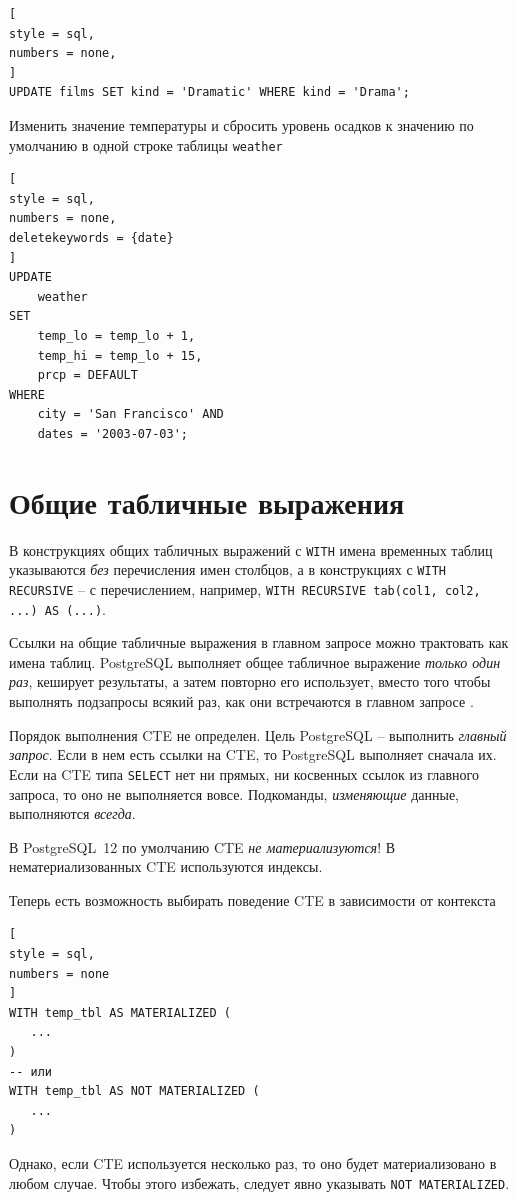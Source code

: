 \documentclass[%
	11pt,
	a4paper,
	utf8,
		]{article}
\begin{document}
\begin{lstlisting}[
style = sql,
numbers = none,
]
UPDATE films SET kind = 'Dramatic' WHERE kind = 'Drama';
\end{lstlisting}

Изменить значение температуры и сбросить уровень осадков к значению по умолчанию в одной строке таблицы \texttt{weather}

\begin{lstlisting}[
style = sql,
numbers = none,
deletekeywords = {date}
]
UPDATE
    weather
SET
    temp_lo = temp_lo + 1,
    temp_hi = temp_lo + 15,
    prcp = DEFAULT
WHERE
    city = 'San Francisco' AND
    dates = '2003-07-03';
\end{lstlisting}


\section{Общие табличные выражения}

В конструкциях общих табличных выражений с \texttt{WITH} имена временных таблиц указываются \emph{без} перечисления имен столбцов, а в конструкциях с \texttt{WITH RECURSIVE} -- с перечислением, например, \lstinline[style=sql]{WITH RECURSIVE tab(col1, col2, ...) AS (...)}.

Ссылки на общие табличные выражения в главном запросе можно трактовать как имена таблиц. PostgreSQL выполняет общее табличное выражение \emph{только один раз}, кеширует результаты, а затем повторно его использует, вместо того чтобы выполнять подзапросы всякий раз, как они встречаются в главном запросе \cite[]{juba:2019}.

Порядок выполнения CTE не определен. Цель PostgreSQL -- выполнить \emph{главный запрос}. Если в нем есть ссылки на CTE, то PostgreSQL выполняет сначала их. Если на CTE типа \texttt{SELECT} нет ни прямых, ни косвенных ссылок из главного запроса, то оно не выполняется вовсе. Подкоманды, \emph{изменяющие} данные, выполняются \emph{всегда}.

В PostgreSQL~12 по умолчанию CTE \emph{не материализуются}! В нематериализованных CTE используются индексы.

Теперь есть возможность выбирать поведение CTE в зависимости от контекста
\begin{lstlisting}[
style = sql,
numbers = none
]
WITH temp_tbl AS MATERIALIZED (
   ...
)
-- или 
WITH temp_tbl AS NOT MATERIALIZED (
   ...
)
\end{lstlisting}

Однако, если CTE используется несколько раз, то оно будет материализовано в любом случае. Чтобы этого избежать, следует явно указывать \texttt{NOT MATERIALIZED}.
\end{document}
